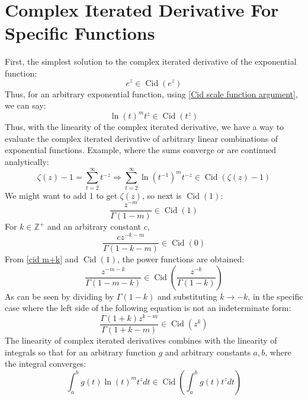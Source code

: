 \documentclass[]{article}
\DeclareMathOperator{\Cid}{Cid}
\newcommand{\pqty}[1]{{\left(#1\right)}}
\numberwithin{equation}{section}
\begin{document}
	\section{Complex Iterated Derivative For Specific Functions}
	First, the simplest solution to the complex iterated derivative of the exponential function:
	\begin{equation}
		e^z\in \Cid\pqty{e^z}
	\end{equation}
	Thus, for an arbitrary exponential function, using \eqref{Cid scale function argument}, we can say:
	\begin{equation}
		\ln\pqty{t}^m t^z\in \Cid\pqty{t^z}
	\end{equation}
	Thus, with the linearity of the complex iterated derivative, we have a way to evaluate the complex iterated derivative of arbitrary linear combinations of exponential functions. Example, where the sums converge or are continued analytically:
	\begin{equation}
		\zeta\pqty{z}-1=\sum_{t=2}^{\infty}t^{-z}
		\Rightarrow
		\sum_{t=2}^{\infty}\ln\pqty{t^{-1}}^m t^{-z}\in\Cid\pqty{\zeta\pqty{z}-1}
	\end{equation}
	We might want to add $1$ to get $\zeta\pqty{z}$, so next is $\Cid\pqty{1}$:
	\begin{equation}
		\frac{z^{-m}}{\Gamma\pqty{1-m}}\in\Cid\pqty{1}
	\end{equation}
	For $k\in\mathbb{Z}^+$ and an arbitrary constant $c$,
	\begin{equation}
		\frac{cz^{-k-m}}{\Gamma\pqty{1-k-m}}\in\Cid\pqty{0}
	\end{equation}
	From \eqref{cid m+k} and $\Cid\pqty{1}$, the power functions are obtained:
	\begin{equation}
		\frac{z^{-m-k}}{\Gamma\pqty{1-m-k}}\in\Cid\pqty{\frac{z^{-k}}{\Gamma\pqty{1-k}}}
	\end{equation}
	As can be seen by dividing by $\Gamma\pqty{1-k}$ and substituting $k\to -k$, in the specific case where the left side of the following equation is not an indeterminate form:
	\begin{equation} \frac{\Gamma\pqty{1+k}z^{k-m}}{\Gamma\pqty{1+k-m}}\in\Cid\pqty{z^{k}}
	\end{equation}
	The linearity of complex iterated derivatives combines with the linearity of integrals so that for an arbitrary function $g$ and arbitrary constants $a,b$, where the integral converges:
	\begin{equation}
		\int_{a}^{b}g\pqty{t}\ln\pqty{t}^m t^z dt
		\in\Cid\pqty{\int_{a}^{b}g\pqty{t}t^z dt}
	\end{equation}
	
\end{document}
